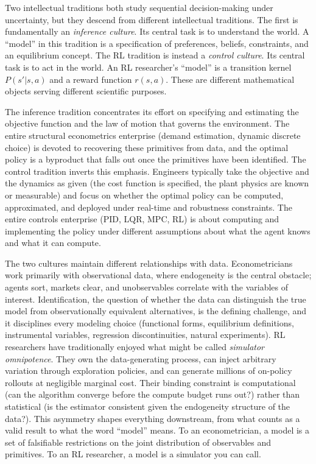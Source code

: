 Two intellectual traditions both study sequential decision-making under uncertainty, but they descend from different intellectual traditions. The first is fundamentally an \textit{inference culture}. Its central task is to understand the world. A ``model'' in this tradition is a specification of preferences, beliefs, constraints, and an equilibrium concept. The RL tradition is instead a \textit{control culture}. Its central task is to act in the world. An RL researcher's ``model'' is a transition kernel $P(s'|s,a)$ and a reward function $r(s,a)$. These are different mathematical objects serving different scientific purposes.

The inference tradition concentrates its effort on specifying and estimating the objective function and the law of motion that governs the environment. The entire structural econometrics enterprise (demand estimation, dynamic discrete choice) is devoted to recovering these primitives from data, and the optimal policy is a byproduct that falls out once the primitives have been identified. The control tradition inverts this emphasis. Engineers typically take the objective and the dynamics as given (the cost function is specified, the plant physics are known or measurable) and focus on whether the optimal policy can be computed, approximated, and deployed under real-time and robustness constraints. The entire controls enterprise (PID, LQR, MPC, RL) is about computing and implementing the policy under different assumptions about what the agent knows and what it can compute.

The two cultures maintain different relationships with data. Econometricians work primarily with observational data, where endogeneity is the central obstacle; agents sort, markets clear, and unobservables correlate with the variables of interest. Identification, the question of whether the data can distinguish the true model from observationally equivalent alternatives, is the defining challenge, and it disciplines every modeling choice (functional forms, equilibrium definitions, instrumental variables, regression discontinuities, natural experiments). RL researchers have traditionally enjoyed what might be called \textit{simulator omnipotence}. They own the data-generating process, can inject arbitrary variation through exploration policies, and can generate millions of on-policy rollouts at negligible marginal cost. Their binding constraint is computational (can the algorithm converge before the compute budget runs out?) rather than statistical (is the estimator consistent given the endogeneity structure of the data?). This asymmetry shapes everything downstream, from what counts as a valid result to what the word ``model'' means. To an econometrician, a model is a set of falsifiable restrictions on the joint distribution of observables and primitives. To an RL researcher, a model is a simulator you can call.

